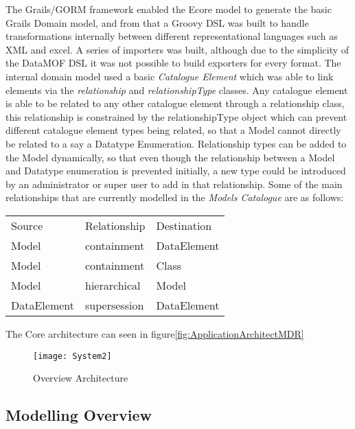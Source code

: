 The Grails/GORM framework enabled the Ecore model to generate the basic Grails Domain model, and from that a Groovy DSL was built to handle transformations internally between different representational languages such as XML and excel. A series of importers was built, although due to the simplicity of the DataMOF DSL it was not possible to build exporters for every format. The internal domain model used a basic \emph{Catalogue Element} which was able to link elements via the \emph{relationship} and \emph{relationshipType} classes. Any catalogue element is able to be related to any other catalogue element through a relationship class, this relationship is constrained by the relationshipType object which can prevent different catalogue element types being related, so that a Model cannot directly be related to a say a Datatype Enumeration. 
Relationship types can be added to the Model dynamically, so that even though the relationship between a Model and Datatype enumeration is prevented initially, a new type could be introduced by an administrator or super user to add in that relationship.
Some of the main relationships that are currently modelled in the \emph{Models Catalogue} are as follows:
 
\begin{center}
	\begin{tabular}{ p{1.5cm}  p{1.5cm}  p{1.5cm}   }  %
		Source & Relationship & Destination  \\
		Model & containment & DataElement   \\
	    Model & containment & Class    \\
	    Model & hierarchical & Model  \\
	    DataElement & supersession & DataElement  \\          
	\end{tabular}
\end{center}

The Core architecture can seen in figure\ref{fig:ApplicationArchitectMDR} 

\begin{figure}[here]
	\texttt{[image: System2]}
	\caption{Overview Architecture} 
	\label{fig:System2MDR}
\end{figure}
 
\subsection{Modelling Overview}





 
 